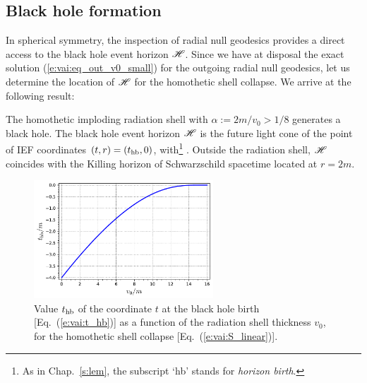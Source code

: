 \subsection{Black hole formation} \label{s:vai:BH_formation}

In spherical symmetry, the inspection of radial null geodesics provides
a direct access to the black hole event horizon $\mathscr{H}$.
Since we have at disposal the exact solution
(\ref{e:vai:eq_out_v0_small}) for the outgoing radial null geodesics,
let us determine the location of $\mathscr{H}$ for the homothetic
shell collapse.
We arrive at the following result:
\begin{prop}
The homothetic imploding radiation shell with $\alpha := 2m/v_0 > 1/8$
generates a black hole. The black hole event horizon $\mathscr{H}$
is the future light cone of the point of IEF coordinates
$(t, r) = (t_{\rm hb}, 0)$, with\footnote{As in Chap.~\ref{s:lem}, the subscript `hb' stands
for \emph{horizon birth}.}
\be \label{e:vai:t_hb}
     .
\ee
Outside the radiation shell, $\mathscr{H}$ coincides with the
Killing horizon of Schwarzschild spacetime located at $r=2m$.
\end{prop}

\begin{figure}
\centerline{\includegraphics[width=0.6\textwidth]{vai_thb_v0.pdf}}
\caption[]{\label{f:vai:thb_v0} \footnotesize
Value $t_{\rm hb}$ of the coordinate $t$ at the black hole birth [Eq.~(\ref{e:vai:t_hb})]
as a function of the radiation shell thickness $v_0$, for
the homothetic shell collapse [Eq.~(\ref{e:vai:S_linear})].
}
\end{figure}


